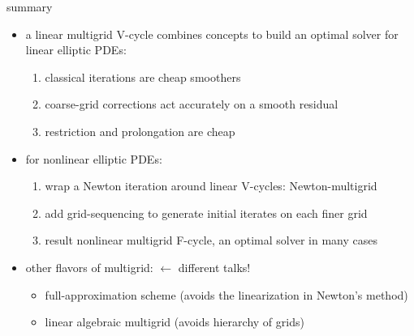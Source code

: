 \documentclass[10pt,
               svgnames,
               hyperref={colorlinks,citecolor=DeepPink4,linkcolor=FireBrick,urlcolor=Maroon},
               usepdftitle=false]{beamer}
\begin{document}
\begin{frame}{summary}
\begin{itemize}
\item a \alert{linear multigrid V-cycle} combines concepts to build an optimal solver for linear elliptic PDEs:
\begin{enumerate}
\item classical iterations are cheap smoothers
\item coarse-grid corrections act accurately on a smooth residual
\item restriction and prolongation are cheap
\end{enumerate}

\medskip
\item for nonlinear elliptic PDEs:
\begin{enumerate}
\item wrap a Newton iteration around linear V-cycles: \alert{Newton-multigrid}
\item add grid-sequencing to generate initial iterates on each finer grid
\item result \alert{nonlinear multigrid F-cycle}, an optimal solver in many cases
\end{enumerate}

\medskip
\item other flavors of multigrid: \hfill {\color{gray}\small $\leftarrow$ different talks!}
    \begin{itemize}
    \item[$\circ$] full-approximation scheme (avoids the linearization in Newton's method)
    \item[$\circ$] linear algebraic multigrid (avoids hierarchy of grids)
    \end{itemize}
\end{itemize}
\end{frame}
\end{document}
